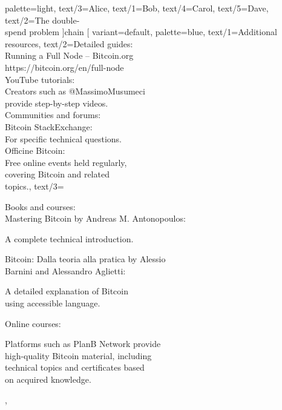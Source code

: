 \documentclass[aspectratio=169]{beamer}
\begin{document}
  palette={light},
  text/3={Alice},
  text/1={Bob},
  text/4={Carol},
  text/5={Dave},
  text/2={The double-\\spend problem}
]{chain}
\gdef\studiocataloguename{\detokenize{key-to-addresses}}
\gdef\studiocataloguename{\detokenize{dual-consensus-diagram}}
\gdef\studiocataloguename{\detokenize{cipher-wheel}}
\gdef\studiocataloguename{\detokenize{blue-resources-columns}}
\studiotemplate[
  variant={default},
  palette={blue},
  text/1={Additional resources},
  text/2={Detailed guides:\\Running a Full Node -- Bitcoin.org\\https://bitcoin.org/en/full-node\\YouTube tutorials:\\Creators such as @MassimoMusumeci\\provide step-by-step videos.\\Communities and forums:\\Bitcoin StackExchange:\\For specific technical questions.\\Officine Bitcoin:\\Free online events held regularly,\\covering Bitcoin and related\\topics.},
  text/3={Books and courses:\\Mastering Bitcoin by Andreas M. Antonopoulos:\par A complete technical introduction.\par Bitcoin: Dalla teoria alla pratica by Alessio\\Barnini and Alessandro Aglietti:\par A detailed explanation of Bitcoin\\using accessible language.\par Online courses:\par Platforms such as PlanB Network provide\\high-quality Bitcoin material, including\\technical topics and certificates based\\on acquired knowledge.},
\end{document}
